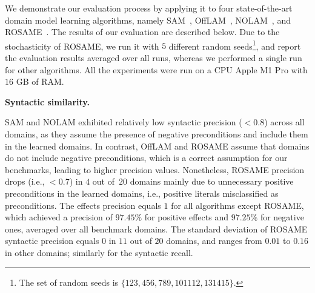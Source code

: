 \documentclass[letterpaper]{article} %
\newcommand{\nolam}{NOLAM\xspace}
\newcommand{\offlam}{OffLAM\xspace}
\newcommand{\rosame}{ROSAME\xspace}
\newcommand{\samshort}{SAM\xspace}
\newcommand{\miniparagraph}[1]{\textbf{#1.}}
\newif\ifaddcomments
\newcommand{\roni}[1]{\ifaddcomments{\textcolor{red}{[Roni: #1]}}\fi}
\begin{document}
We demonstrate our evaluation process by applying it to four state-of-the-art domain model learning algorithms, namely \samshort~\citep{juba2021safe}, \offlam~\citep{LAMANNA2025104256}, \nolam~\citep{Lamanna24}, and \rosame~\citep{xi2024neuro}. The results of our evaluation are described below. 
Due to the stochasticity of \rosame, we run it with $5$ different random seeds\footnote{The set of random seeds is $\{123, 456, 789, 101112, 131415\}$.}, and report the evaluation results averaged over all runs, whereas we performed a single run for other algorithms.  
All the experiments were run on a CPU Apple M1 Pro with $16$ GB of RAM.





\miniparagraph{Syntactic similarity} 
%

%
\samshort and \nolam exhibited relatively low syntactic precision ($<0.8$) across all domains, as they assume the presence of negative preconditions and include them in the learned domains. 
In contrast, \offlam and \rosame assume that domains do not include negative preconditions, which is a correct assumption for our benchmarks, leading to higher precision values.
%
Nonetheless, \rosame precision drops (i.e., $< 0.7$) in $4$ out of~$20$ domains mainly due to unnecessary positive preconditions in the learned domains, i.e., positive literals misclassified as preconditions.
%
The effects precision equals $1$ for all algorithms except \rosame, which achieved a precision of $97.45\%$ for positive effects and $97.25\%$ for negative ones, averaged over all benchmark domains. 
The standard deviation of \rosame syntactic precision equals $0$ in $11$ out of $20$ domains, and ranges from $0.01$ to $0.16$ in other domains; similarly for the syntactic recall.
\end{document}
